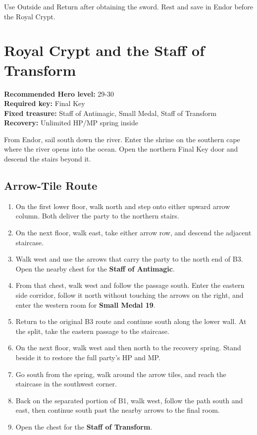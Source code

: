 \documentclass[
  american,
  10pt,
  letterpaper,
  oneside,
  open=any]{scrreprt}
\providecommand{\tightlist}{%
  \setlength{\itemsep}{0pt}\setlength{\parskip}{0pt}}
\begin{document}
Use Outside and Return after obtaining the sword. Rest and save in Endor
before the Royal Crypt.

\section{Royal Crypt and the Staff of
Transform}\label{royal-crypt-and-the-staff-of-transform}

\textbf{Recommended Hero level:} 29-30\\
\textbf{Required key:} Final Key\\
\textbf{Fixed treasure:} Staff of Antimagic, Small Medal, Staff of
Transform\\
\textbf{Recovery:} Unlimited HP/MP spring inside

From Endor, sail south down the river. Enter the shrine on the southern
cape where the river opens into the ocean. Open the northern Final Key
door and descend the stairs beyond it.

\subsection{Arrow-Tile Route}\label{arrow-tile-route}

\begin{enumerate}
\def\labelenumi{\arabic{enumi}.}
\tightlist
\item
  On the first lower floor, walk north and step onto either upward arrow
  column. Both deliver the party to the northern stairs.
\item
  On the next floor, walk east, take either arrow row, and descend the
  adjacent staircase.
\item
  Walk west and use the arrows that carry the party to the north end of
  B3. Open the nearby chest for the \textbf{Staff of Antimagic}.
\item
  From that chest, walk west and follow the passage south. Enter the
  eastern side corridor, follow it north without touching the arrows on
  the right, and enter the western room for \textbf{Small Medal 19}.
\item
  Return to the original B3 route and continue south along the lower
  wall. At the split, take the eastern passage to the staircase.
\item
  On the next floor, walk west and then north to the recovery spring.
  Stand beside it to restore the full party's HP and MP.
\item
  Go south from the spring, walk around the arrow tiles, and reach the
  staircase in the southwest corner.
\item
  Back on the separated portion of B1, walk west, follow the path south
  and east, then continue south past the nearby arrows to the final
  room.
\item
  Open the chest for the \textbf{Staff of Transform}.
\end{enumerate}
\end{document}
